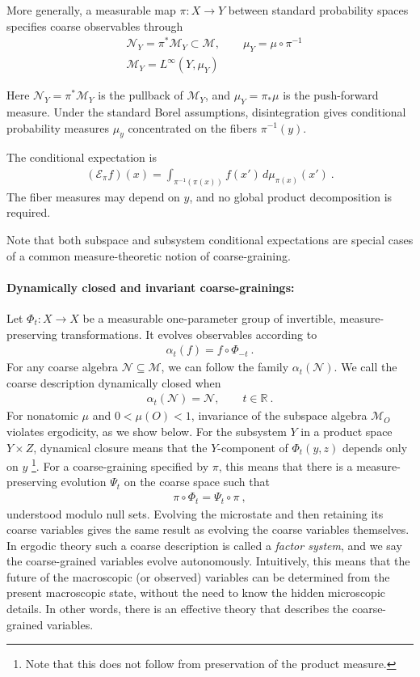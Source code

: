 \documentclass[a4paper,11pt]{article}
\theoremstyle{definition}
\newcommand{\nn}{\nonumber}
\newcommand{\mN}{\mathcal{N}}
\newcommand{\mM}{\mathcal{M}}
\newcommand{\mE}{\mathcal{E}}
\begin{document}
More generally, a measurable map $\pi:X\to Y$ between standard probability spaces specifies coarse observables through
\begin{align}
    &\mN_Y=\pi^*\mM_Y\subset \mM,
    \qquad \mu_Y=\mu\circ \pi^{-1}\nn\\
    &\mM_Y=L^\infty(Y,\mu_Y)
\end{align}

Here $\mN_Y=\pi^*\mM_Y$ is the pullback of $\mM_Y$, and $\mu_Y=\pi_*\mu$ is the
push-forward measure. Under the standard Borel assumptions, disintegration gives
conditional probability measures $\mu_y$ concentrated on the fibers $\pi^{-1}(y)$.

The conditional expectation is
\begin{align}
    (\mE_\pi f)(x)=\int_{\pi^{-1}(\pi(x))}f(x')\,d\mu_{\pi(x)}(x')\ .
\end{align}
The fiber measures may depend on $y$, and no global product decomposition is required.

Note that both subspace and subsystem conditional expectations are special cases of a common measure-theoretic notion of coarse-graining.

\paragraph{Dynamically closed and invariant coarse-grainings:}
Let $\Phi_t:X\to X$ be a measurable one-parameter group of invertible, measure-preserving transformations. It evolves observables according to
\begin{align}
    \alpha_t(f)=f\circ\Phi_{-t}\ .
\end{align}
For any coarse algebra $\mN\subseteq\mM$, we can follow the family $\alpha_t(\mN)$. We call the coarse description dynamically closed when
\begin{align}\label{eq:classical-coarse-invariance}
    \alpha_t(\mN)=\mN,\qquad t\in\mathbb R\ .
\end{align}
For nonatomic $\mu$ and $0<\mu(O)<1$, invariance of the subspace algebra $\mM_O$ violates ergodicity, as we show below.
For the subsystem $Y$ in a product space $Y\times Z$, dynamical closure means that the $Y$-component of $\Phi_t(y,z)$ depends only on $y$ \footnote{Note that this does not follow from preservation of the product measure.}. For a coarse-graining specified by $\pi$, this means that there is a measure-preserving evolution $\Psi_t$ on the coarse space such that
\begin{align}\label{eq:classical-factor-intertwining}
    \pi\circ\Phi_t=\Psi_t\circ\pi\ ,
\end{align}
understood modulo null sets. Evolving the microstate and then retaining its coarse variables gives the same result as evolving the coarse variables themselves. In ergodic theory such a coarse description is called a {\it factor system}, and we say the coarse-grained variables evolve autonomously. Intuitively, this means that the future of the macroscopic (or observed) variables can be determined from the present macroscopic state, without the need to know the hidden microscopic details. In other words, there is an effective theory that describes the coarse-grained variables.
\end{document}
